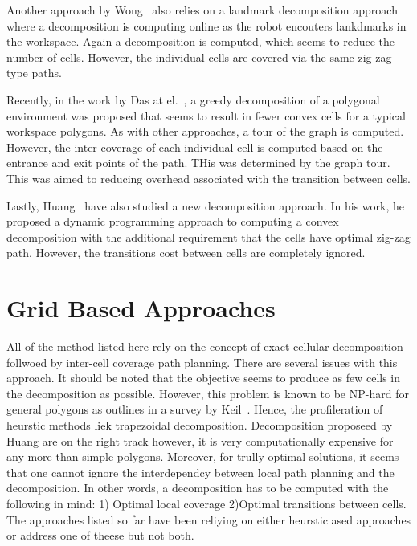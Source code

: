 \documentclass[../main.tex]{subfiles}
\begin{document}
Another approach by Wong~\cite{wong2004complete} also relies on a landmark decomposition approach where a decomposition is computing online as the robot encouters lankdmarks in the workspace. Again a decomposition is computed, which seems to reduce the number of cells. However, the individual cells are covered via the same zig-zag type paths.

Recently, in the work by Das at el.~\cite{das2014mapping}, a greedy decomposition of a polygonal environment was proposed that seems to result in fewer convex cells for a typical workspace polygons. As with other approaches, a tour of the graph is computed. However, the inter-coverage of each individual cell is computed based on the entrance and exit points of the path. THis was determined by the graph tour. This was aimed to reducing overhead associated with the transition between cells.

Lastly, Huang~\cite{Huang2001optimal} have also studied a new decomposition approach. In his work, he proposed a dynamic programming approach to computing a convex decomposition with the additional requirement that the cells have optimal zig-zag path. However, the transitions cost between cells are completely ignored.

\section{Grid Based Approaches}
\label{section:grid_based_approaches}

All of the method listed here rely on the concept of exact cellular decomposition follwoed by inter-cell coverage path planning. There are several issues with this approach. It should be noted that the objective seems to produce as few cells in the decomposition as possible. However, this problem is known to be NP-hard for general polygons as outlines in a survey by Keil~\cite{keil2000polygon}. Hence, the profileration of heurstic methods liek trapezoidal decomposition. Decomposition proposeed by Huang are on the right track however, it is very computationally expensive for any more than simple polygons. Moreover, for trully optimal solutions, it seems that one cannot ignore the interdependcy between local path planning and the decomposition. In other words, a decomposition has to be computed with the following in mind: 1) Optimal local coverage 2)Optimal transitions between cells. The approaches listed so far have been reliying on either heurstic ased approaches or address one of theese but not both.
\end{document}
